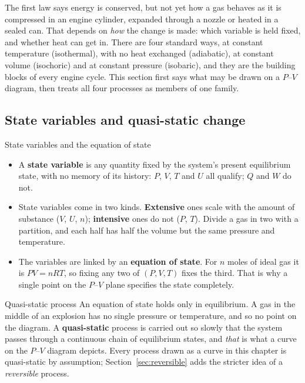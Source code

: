 The first law says energy is conserved, but not yet how a gas behaves as it is compressed in an engine
cylinder, expanded through a nozzle or heated in a sealed can. That depends on \emph{how} the change is
made: which variable is held fixed, and whether heat can get in. There are four standard ways, at constant
temperature (isothermal), with no heat exchanged (adiabatic), at constant volume (isochoric) and at
constant pressure (isobaric), and they are the building blocks of every engine cycle. This section first
says what may be drawn on a $P$--$V$ diagram, then treats all four processes as members of one family.

\subsection{State variables and quasi-static change}\label{sec:quasistatic}

\begin{defbox}{State variables and the equation of state}
\begin{itemize}
\item A \textbf{state variable} is any quantity fixed by the system's present equilibrium state, with no
      memory of its history: $P$, $V$, $T$ and $U$ all qualify; $Q$ and $W$ do not.
\item State variables come in two kinds. \textbf{Extensive} ones scale with the amount of substance ($V$,
      $U$, $n$); \textbf{intensive} ones do not ($P$, $T$). Divide a gas in two with a partition, and each
      half has half the volume but the same pressure and temperature.
\item The variables are linked by an \textbf{equation of state}. For $n$ moles of ideal gas it is
      $PV=nRT$, so fixing any two of $(P,V,T)$ fixes the third. That is why a single point on the
      $P$--$V$ plane specifies the state completely.
\end{itemize}
\end{defbox}

\begin{defbox}{Quasi-static process}
An equation of state holds only in equilibrium. A gas in the middle of an explosion has no single
pressure or temperature, and so no point on the diagram. A \textbf{quasi-static} process is carried out
so slowly that the system passes through a continuous chain of equilibrium states, and \emph{that} is
what a curve on the $P$--$V$ diagram depicts. Every process drawn as a curve in this chapter is
quasi-static by assumption; Section~\ref{sec:reversible} adds the stricter idea of a \emph{reversible}
process.
\end{defbox}

